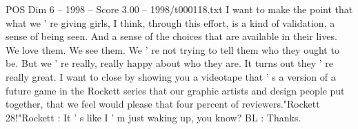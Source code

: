 \begin{textsample}{POS Dim 6 – 1998 – Score 3.00 – 1998/t000118.txt}
I want to make the point that what we ' re giving girls, I think, through this effort, is a kind of validation, a sense of being seen.
And a sense of the choices that are available in their lives.
We love them.
We see them.
We ' re not trying to tell them who they ought to be.
But we ' re really, really happy about who they are.
It turns out they ' re really great.
I want to close by showing you a videotape that ' s a version of a future game in the Rockett series that our graphic artists and design people put together, that we feel would please that four percent of reviewers."Rockett 28!"Rockett : It ' s like I ' m just waking up, you know?
BL : Thanks.

\end{textsample}
